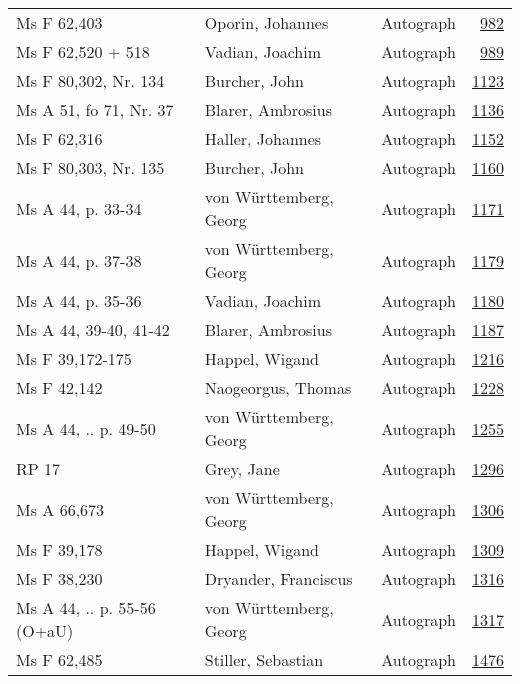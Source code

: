 \documentclass[10pt,a4paper,landscape]{report}
\begin{document}
\begin{longtable}{p{16cm}p{4cm}lr}
Ms F 62,403	&	Oporin, Johannes	&	Autograph	&	\href{http://130.60.24.72/assignment/982}{982}\\
Ms F 62,520 + 518	&	Vadian, Joachim	&	Autograph	&	\href{http://130.60.24.72/assignment/989}{989}\\
Ms F 80,302, Nr. 134	&	Burcher, John	&	Autograph	&	\href{http://130.60.24.72/assignment/1123}{1123}\\
Ms A 51, fo 71, Nr. 37	&	Blarer, Ambrosius	&	Autograph	&	\href{http://130.60.24.72/assignment/1136}{1136}\\
Ms F 62,316	&	Haller, Johannes	&	Autograph	&	\href{http://130.60.24.72/assignment/1152}{1152}\\
Ms F 80,303, Nr. 135	&	Burcher, John	&	Autograph	&	\href{http://130.60.24.72/assignment/1160}{1160}\\
Ms A 44, p. 33-34	&	von Württemberg, Georg	&	Autograph	&	\href{http://130.60.24.72/assignment/1171}{1171}\\
Ms A 44, p. 37-38	&	von Württemberg, Georg	&	Autograph	&	\href{http://130.60.24.72/assignment/1179}{1179}\\
Ms A 44, p. 35-36	&	Vadian, Joachim	&	Autograph	&	\href{http://130.60.24.72/assignment/1180}{1180}\\
Ms A 44, 39-40, 41-42	&	Blarer, Ambrosius	&	Autograph	&	\href{http://130.60.24.72/assignment/1187}{1187}\\
Ms F 39,172-175	&	Happel, Wigand	&	Autograph	&	\href{http://130.60.24.72/assignment/1216}{1216}\\
Ms F 42,142	&	Naogeorgus, Thomas	&	Autograph	&	\href{http://130.60.24.72/assignment/1228}{1228}\\
Ms A 44, .. p. 49-50	&	von Württemberg, Georg	&	Autograph	&	\href{http://130.60.24.72/assignment/1255}{1255}\\
RP 17	&	Grey, Jane	&	Autograph	&	\href{http://130.60.24.72/assignment/1296}{1296}\\
Ms A 66,673	&	von Württemberg, Georg	&	Autograph	&	\href{http://130.60.24.72/assignment/1306}{1306}\\
Ms F 39,178	&	Happel, Wigand	&	Autograph	&	\href{http://130.60.24.72/assignment/1309}{1309}\\
Ms F 38,230	&	Dryander, Franciscus	&	Autograph	&	\href{http://130.60.24.72/assignment/1316}{1316}\\
Ms A 44, .. p. 55-56 (O+aU)	&	von Württemberg, Georg	&	Autograph	&	\href{http://130.60.24.72/assignment/1317}{1317}\\
Ms F 62,485	&	Stiller, Sebastian	&	Autograph	&	\href{http://130.60.24.72/assignment/1476}{1476}\\

\end{longtable}
\end{document}

